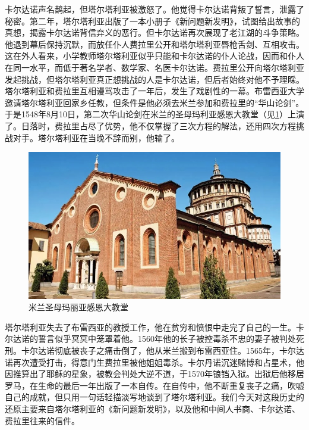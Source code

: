 \documentclass[b5paper]{ctexart}
\begin{document}
卡尔达诺声名鹊起，但塔尔塔利亚被激怒了。他觉得卡尔达诺背叛了誓言，泄露了秘密。第二年，塔尔塔利亚出版了一本小册子《新问题新发明》，试图给出故事的真想，揭露卡尔达诺背信弃义的恶行。但卡尔达诺再次展现了老江湖的斗争策略。他退到幕后保持沉默，而放任仆人费拉里公开和塔尔塔利亚唇枪舌剑、互相攻击。这在外人看来，小学教师塔尔塔利亚似乎只能和卡尔达诺的仆人论战，因而和仆人在同一水平，而低于著名学者、数学家、名医卡尔达诺。费拉里公开向塔尔塔利亚发起挑战，但塔尔塔利亚真正想挑战的人是卡尔达诺，但后者始终对他不予理睬。塔尔塔利亚和费拉里互相谩骂攻击了一年后，发生了戏剧性的一幕。布雷西亚大学邀请塔尔塔利亚回家乡任教，但条件是他必须去米兰参加和费拉里的“华山论剑”。于是1548年8月10日，第二次华山论剑在米兰的圣母玛利亚感恩大教堂（见\cref{fig:church-Milan}）上演了。日落时，费拉里占尽了优势，他不仅掌握了三次方程的解法，还用四次方程挑战对手。塔尔塔利亚在当晚不辞而别，他输了。

\begin{figure}[htbp]
  \centering
  \includegraphics[scale=0.33]{img/churchmilan}
  \caption{米兰圣母玛丽亚感恩大教堂}
 \label{fig:church-Milan}
\end{figure}

塔尔塔利亚失去了布雷西亚的教授工作，他在贫穷和愤恨中走完了自己的一生。卡尔达诺的誓言似乎冥冥中笼罩着他。1560年他的长子被控毒杀不忠的妻子被判处死刑。卡尔达诺彻底被丧子之痛击倒了，他从米兰搬到布雷西亚住。1565年，卡尔达诺再次遭受打击，得意门生费拉里被他姐姐毒杀。卡尔丹诺沉迷赌博和占星术，他因推算出了耶稣的星象，被教会判处大逆不道，于1570年锒铛入狱。出狱后他移居罗马，在生命的最后一年出版了一本自传。在自传中，他不断重复丧子之痛，吹嘘自己的成就，但只用一句话轻描淡写地谈到了塔尔塔利亚。我们今天对这段历史的还原主要来自塔尔塔利亚的《新问题新发明》，以及他和中间人书商、卡尔达诺、费拉里往来的信件。
\end{document}
